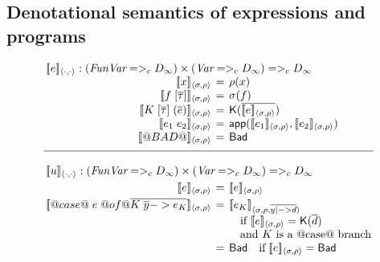 

\subsection{Denotational semantics of expressions and programs}

\begin{figure}
$$
\setlength{\arraycolsep}{2pt}
\begin{array}{c}
\begin{array}{rcl}
\multicolumn{3}{l}{\interp{e}{\cdot}{\cdot} : (\FVarCpo =>_c D_{\infty}) \times (\VarCpo =>_c D_{\infty}) =>_c D_{\infty}} \\
  \interp{x}{\sigma}{\rho} & = & \rho(x) \\
  \interp{f\;[\taus]}{\sigma}{\rho} & = & \sigma(f) \\
  \interp{K\;[\taus]\;(\ol{e})}{\sigma}{\rho} & = & \roll{\ret{\injK{K}{\ol{\interp{e}{\sigma}{\rho}}}}} \\
  \interp{e_1\;e_2}{\sigma}{\rho} & = & \dapp(\interp{e_1}{\sigma}{\rho}, \interp{e_2}{\sigma}{\rho}) \\
  \interp{@BAD@}{\sigma}{\rho} & = & \roll{\ret{\injBad}} \\[2mm]
\hline \\
\multicolumn{3}{l}{\interp{u}{\cdot}{\cdot} : (\FVarCpo =>_c D_{\infty}) \times (\VarCpo =>_c D_{\infty}) =>_c D_{\infty}} \\[1mm]
  \interp{e}{\sigma}{\rho} & = & \interp{e}{\sigma}{\rho} \\[1mm]
  \interp{@case@\;e\;@of@ \ol{ K\;\ys -> e_K}}{\sigma}{\rho}
          & = & \unroll{\interp{e_K}{\sigma}{\rho, \ol{y |-> d}}} \\
          & & \quad \text{if $\unroll{\interp{e}{\sigma}{\rho}} = \injK{K}{\ol{d}}$} \\
          & & \quad \text{and $K$ is a @case@ branch} \\
          & = & \injBad \quad \text{if}\; \unroll{\interp{e}{\sigma}{\rho}} = \injBad \\

\end{array}
\end{array}$$
\end{figure}

